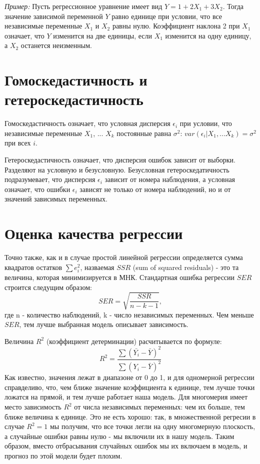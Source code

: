 \textit{Пример:}
Пусть регрессионное уравнение имеет вид $Y = 1 + 2X_1 + 3X_2$. Тогда значение зависимой переменной $Y$ равно единице при условии, что все независимые переменные $X_1$ и $X_2$ равны нулю. Коэффициент наклона 2 при $X_1$ означает, что $Y$ изменится на две единицы, если $X_1$ изменится на одну единицу, а $X_2$ останется неизменным.
\section{Гомоскедастичность и гетероскедастичность}
\hspace*{\parindent}
Гомоскедастичность означает, что условная дисперсия $\epsilon_i$ при условии, что независимые переменные $X_1$, ... $X_k$ постоянные равна $\sigma ^2$: $var(\epsilon_i|X_1, ... X_k) = \sigma ^2$ при всех $i$.

Гетероскедастичность означает, что дисперсия ошибок зависит от выборки. Разделяют на условную и безусловную. Безусловная гетероскедатичность подразумевает, что дисперсия $\epsilon_i$ зависит от номера наблюдения, а условная означает, что ошибки $\epsilon_i$ зависят не только от номера наблюдений, но и от значений зависимых переменных.
\section{Оценка качества регрессии}
\hspace*{\parindent}
Точно также, как и в случае простой линейной регрессии определяется сумма квадратов остатков $\sum e^2_i$, назваемая $SSR$ (sum of squared residuals) - это та величина, которая минимизируется в МНК. Стандартная ошибка регрессии $SER$ строится следущим образом: $$SER = \sqrt{\frac{SSR}{n-k-1}},$$ где n - количество наблюдений, k - число независимых переменных. Чем меньше $SER$, тем лучше выбранная модель описывает зависимость.
\hspace*{\parindent}

Величина $R^2$ (коэффициент детерминации) расчитывается по формуле:
$$R^2 = \frac{\sum(\bar{Y_i} - \bar{Y})^2}{\sum(Y_i - \bar{Y})^2}$$
Как известно, значения лежат в диапазоне от 0 до 1, и для одномерной регрессии справделиво, что, чем ближе значение коэффициента к единице, тем лучше точки ложатся на прямой, и тем лучше работает наша модель. Для многомерия имеет место зависимость $R^2$ от числа независимых переменных: чем их больше, тем ближе величина к единице. Это не есть хорошо: так, в множественной регресии в случае $R^2=1$ мы получим, что все точки легли на одну многомерную плоскость, а случайные ошибки равны нулю - мы включили их в нашу модель. Таким образом, вместо отбрасывания случайных ошибок мы их включаем в модель, и прогноз по этой модели будет плохим.
\hspace*{\parindent}

